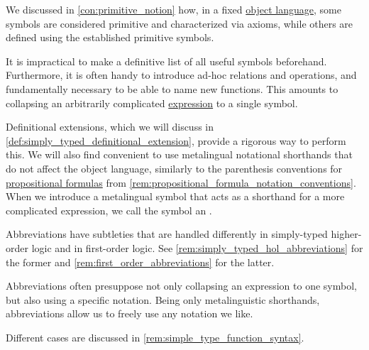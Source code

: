 \begin{concept}\label{con:metalingual_abbreviation}\mimprovised
  We discussed in \cref{con:primitive_notion} how, in a fixed \hyperref[con:metalogic]{object language}, some symbols are considered primitive and characterized via axioms, while others are defined using the established primitive symbols.

  It is impractical to make a definitive list of all useful symbols beforehand. Furthermore, it is often handy to introduce ad-hoc relations and operations, and fundamentally necessary to be able to name new functions. This amounts to collapsing an arbitrarily complicated \hyperref[con:expression]{expression} to a single symbol.

  Definitional extensions, which we will discuss in \cref{def:simply_typed_definitional_extension}, provide a rigorous way to perform this. We will also find convenient to use metalingual notational shorthands that do not affect the object language, similarly to the parenthesis conventions for \hyperref[def:propositional_syntax/formula]{propositional formulas} from \cref{rem:propositional_formula_notation_conventions}. When we introduce a metalingual symbol that acts as a shorthand for a more complicated expression, we call the symbol an .

  Abbreviations have subtleties that are handled differently in simply-typed higher-order logic and in first-order logic. See \cref{rem:simply_typed_hol_abbreviations} for the former and \cref{rem:first_order_abbreviations} for the latter.
\end{concept}
\begin{comments}
  \item Abbreviations often presuppose not only collapsing an expression to one symbol, but also using a specific notation. Being only metalinguistic shorthands, abbreviations allow us to freely use any notation we like.

  Different cases are discussed in \cref{rem:simple_type_function_syntax}.
\end{comments}


